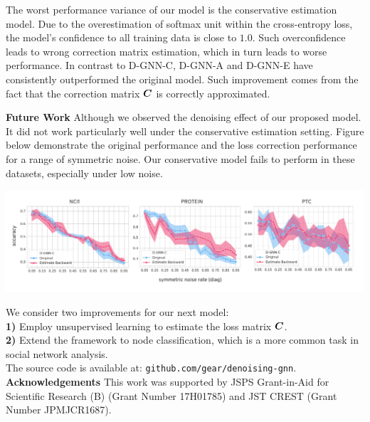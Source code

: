 \documentclass[portrait,final,a0paper,fontscale=0.365]{baposter}
\begin{document}
\begin{poster}
{\vspace{1em}

\noindent
The worst performance variance of our model is the conservative estimation model. Due to the 
overestimation of softmax unit within the cross-entropy loss, the model's confidence 
to all training data is close to $1.0$. Such overconfidence leads to wrong correction
matrix estimation, which in turn leads to worse performance.
In contrast to D-GNN-C, D-GNN-A and D-GNN-E have consistently outperformed the original
model. Such improvement comes from the fact that the correction matrix ${\bm{C}}$ is correctly 
approximated.
\vspace{1em}

\noindent
\textbf{Future Work} Although we observed the denoising effect of our proposed
model. It did not work particularly well under the conservative estimation 
setting. Figure below demonstrate the original performance and the loss 
correction performance for a range of symmetric noise. Our conservative model 
fails to perform in these datasets, especially under low noise. 

\hspace{-1em}\includegraphics[width=0.99\linewidth]{img/notgood}

\noindent
We consider two improvements for our next model:\\
\textbf{1)} Employ unsupervised learning to estimate the loss matrix ${\bm{C}}$.\\
\textbf{2)} Extend the framework to node classification, which is a more common task in social network analysis.\\

\noindent
The source code is available at: \texttt{github.com/gear/denoising-gnn}.\\

\noindent
\textbf{Acknowledgements} This work was supported by JSPS Grant-in-Aid for Scientific Research (B) (Grant Number 17H01785) 
and JST CREST (Grant Number JPMJCR1687).




}

\end{poster}
\end{document}
